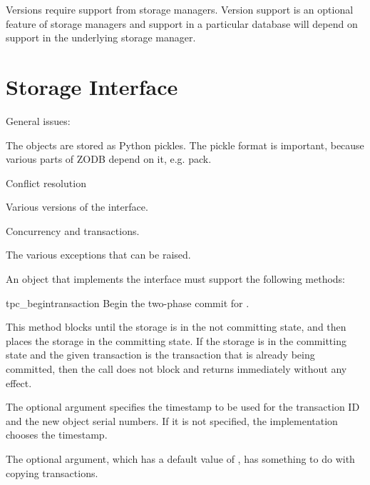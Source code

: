 \documentclass{howto}
\begin{document}
Versions require support from storage managers. Version support is an
optional feature of storage managers and support in a particular
database will depend on support in the underlying storage manager.


\section{Storage Interface}

General issues:

The objects are stored as Python pickles.  The pickle format is
important, because various parts of ZODB depend on it, e.g. pack.

Conflict resolution

Various versions of the interface.

Concurrency and transactions.

The various exceptions that can be raised.

An object that implements the  interface must support
the following methods:

\begin{methoddesc}{tpc_begin}{transaction}
  Begin the two-phase commit for .  

  This method blocks until the storage is in the not committing state,
  and then places the storage in the committing state. If the storage
  is in the committing state and the given transaction is the
  transaction that is already being committed, then the call does not
  block and returns immediately without any effect.

  The optional  argument specifies the timestamp to be used
  for the transaction ID and the new object serial numbers.  If it is
  not specified, the implementation chooses the timestamp.

  The optional  argument, which has a default value of
  , has something to do with copying transactions.
\end{methoddesc}
\end{document}
